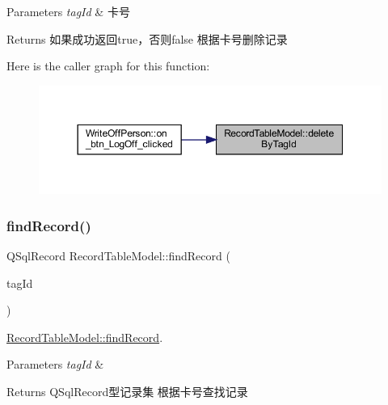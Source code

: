 \begin{DoxyParams}{Parameters}
{\em tag\+Id} & 卡号 \\
\hline
\end{DoxyParams}
\begin{DoxyReturn}{Returns}
如果成功返回true，否则false 根据卡号删除记录 
\end{DoxyReturn}
Here is the caller graph for this function\+:
\nopagebreak
\begin{figure}[H]
\begin{center}
\leavevmode
\includegraphics[width=350pt]{class_record_table_model_a100e9367452b370e3959d3694d911d22_icgraph}
\end{center}
\end{figure}
\mbox{\label{class_record_table_model_a80a5cfc5917b47971dfe567921809f6e}} 
\subsubsection{\texorpdfstring{findRecord()}{findRecord()}}
{\footnotesize\ttfamily Q\+Sql\+Record Record\+Table\+Model\+::find\+Record (\begin{DoxyParamCaption}\item[{const Q\+String \&}]{tag\+Id }\end{DoxyParamCaption})}



\mbox{\hyperlink{class_record_table_model_a80a5cfc5917b47971dfe567921809f6e}{Record\+Table\+Model\+::find\+Record}}. 


\begin{DoxyParams}{Parameters}
{\em tag\+Id} & \\
\hline
\end{DoxyParams}
\begin{DoxyReturn}{Returns}
Q\+Sql\+Record型记录集 根据卡号查找记录 
\end{DoxyReturn}


